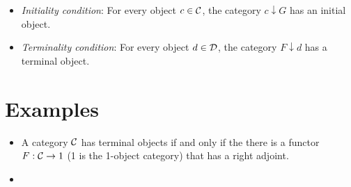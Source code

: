 \begin{fullwidth}
\begin{definition}[Adjunction]
\begin{itemize}
      \begin{center}
      \end{center}
      
      \item \emph{Initiality condition}: For every object $c \in \mathcal C$, the category $c \downarrow G$ 
      has an initial object.

      \item \emph{Terminality condition}: For every object $d \in \mathcal D$, the category $F \downarrow d$ 
      has a terminal object.

    \end{itemize} 
  \end{definition}
 
\end{fullwidth}



\section{Examples}
\begin{itemize}
  \item A category $\mathcal C$ has terminal objects 
  if and only if 
  the there is a functor $F : \mathcal C \to 1$ (1 is the 1-object category)
  that has a right adjoint.
  \item 
\end{itemize}

